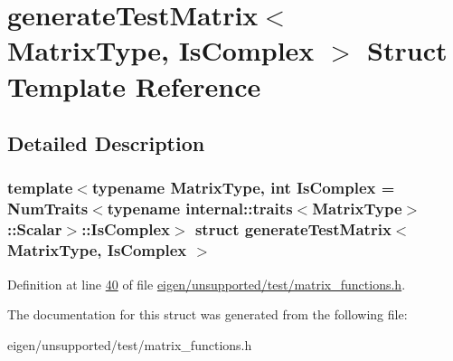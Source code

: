 \hypertarget{structgenerate_test_matrix}{}\section{generate\+Test\+Matrix$<$ Matrix\+Type, Is\+Complex $>$ Struct Template Reference}
\label{structgenerate_test_matrix}


\subsection{Detailed Description}
\subsubsection*{template$<$typename Matrix\+Type, int Is\+Complex = Num\+Traits$<$typename internal\+::traits$<$\+Matrix\+Type$>$\+::\+Scalar$>$\+::\+Is\+Complex$>$\newline
struct generate\+Test\+Matrix$<$ Matrix\+Type, Is\+Complex $>$}



Definition at line \hyperlink{eigen_2unsupported_2test_2matrix__functions_8h_source_l00040}{40} of file \hyperlink{eigen_2unsupported_2test_2matrix__functions_8h_source}{eigen/unsupported/test/matrix\+\_\+functions.\+h}.



The documentation for this struct was generated from the following file\+:\begin{DoxyCompactItemize}
\item 
eigen/unsupported/test/matrix\+\_\+functions.\+h\end{DoxyCompactItemize}

